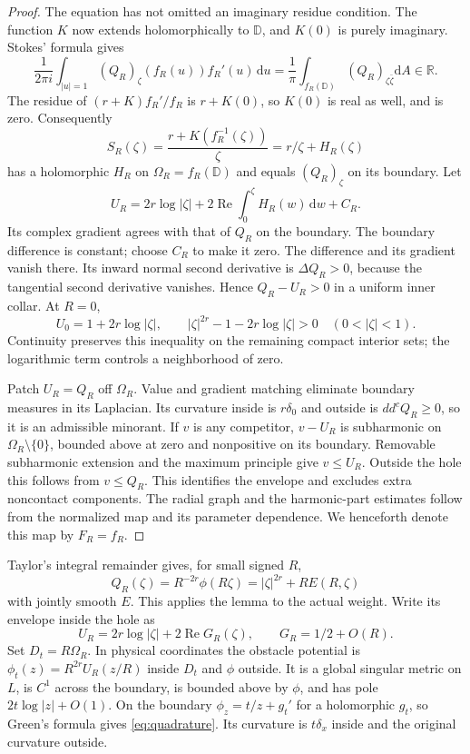 \documentclass[11pt]{article}
\theoremstyle{remark}\newtheorem{remark}[theorem]{Remark}
\newcommand{\ddc}{dd^c}
\newcommand{\dA}{\mathrm dA}
\newcommand{\D}{\mathbb D}
\newcommand{\R}{\mathbb R}
\DeclareMathOperator{\Rea}{Re}
\begin{document}
\begin{proof}
The equation has not omitted an imaginary residue condition. The
function $K$ now extends holomorphically to $\D$, and $K(0)$ is purely
imaginary. Stokes' formula gives
\[
 \frac1{2\pi i}\int_{|u|=1}(Q_R)_\zeta(f_R(u))f_R'(u)\,\mathrm du
 =\frac1\pi\int_{f_R(\D)}(Q_R)_{\zeta\bar\zeta}\dA\in\R.
\]
The residue of $(r+K)f_R'/f_R$ is $r+K(0)$, so $K(0)$ is real as well,
and is zero. Consequently
\[
 S_R(\zeta)=\frac{r+K(f_R^{-1}(\zeta))}{\zeta}
 =r/\zeta+H_R(\zeta)
\]
has a holomorphic $H_R$ on $\Omega_R=f_R(\D)$ and equals $(Q_R)_\zeta$
on its boundary. Let
\[
 U_R=2r\log|\zeta|+2\Rea\int_0^\zeta H_R(w)\,\mathrm dw+C_R.
\]
Its complex gradient agrees with that of $Q_R$ on the boundary.
The boundary difference is constant; choose $C_R$ to make it zero.
The difference and its gradient vanish there. Its inward normal second
derivative is $\Delta Q_R>0$, because the tangential second derivative
vanishes. Hence $Q_R-U_R>0$ in a uniform inner collar. At $R=0$,
\[
 U_0=1+2r\log|\zeta|,\qquad
 |\zeta|^{2r}-1-2r\log|\zeta|>0\quad(0<|\zeta|<1).
\]
Continuity preserves this inequality on the remaining compact interior
sets; the logarithmic term controls a neighborhood of zero.

Patch $U_R=Q_R$ off $\Omega_R$. Value and gradient matching eliminate
boundary measures in its Laplacian. Its curvature inside is $r\delta_0$
and outside is $\ddc Q_R\geq0$, so it is an admissible minorant. If $v$
is any competitor, $v-U_R$ is subharmonic on $\Omega_R\setminus\{0\}$,
bounded above at zero and nonpositive on its boundary. Removable
subharmonic extension and the maximum principle give $v\leq U_R$.
Outside the hole this follows from $v\leq Q_R$. This identifies the
envelope and excludes extra noncontact components. The radial graph and
the harmonic-part estimates follow from the normalized map and its
parameter dependence. We henceforth denote this map by $F_R=f_R$.
\end{proof}

Taylor's integral remainder gives, for small signed $R$,
\[
 Q_R(\zeta)=R^{-2r}\phi(R\zeta)
 =|\zeta|^{2r}+R E(R,\zeta)
\]
with jointly smooth $E$. This applies the lemma to the actual weight.
Write its envelope inside the hole as
\[
 U_R=2r\log|\zeta|+2\Rea G_R(\zeta),\qquad
 G_R=1/2+O(R).
\]
Set $D_t=R\Omega_R$. In physical coordinates the obstacle potential is
$\phi_t(z)=R^{2r}U_R(z/R)$ inside $D_t$ and $\phi$ outside.
It is a global singular metric on $L$, is $C^1$ across the boundary,
is bounded above by $\phi$, and has pole $2t\log|z|+O(1)$.
On the boundary $\phi_z=t/z+g_t'$ for a holomorphic $g_t$, so Green's
formula gives \eqref{eq:quadrature}. Its curvature is $t\delta_x$
inside and the original curvature outside.
\end{document}

